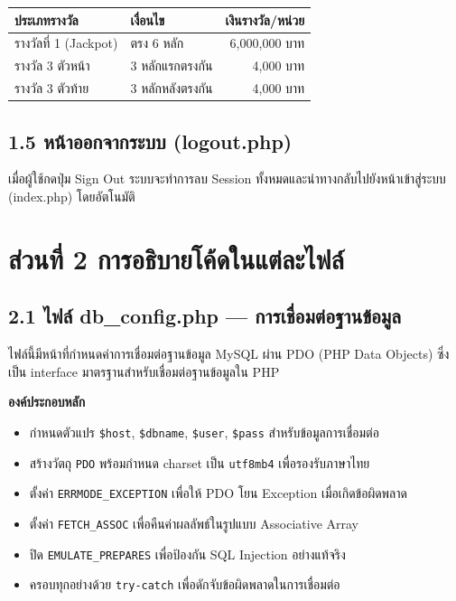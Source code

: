 \documentclass[a4paper,12pt]{article}
\begin{document}
\vspace{0.5em}
\begin{tabularx}{\textwidth}{|l|X|r|}
\hline
\textbf{ประเภทรางวัล} & \textbf{เงื่อนไข} & \textbf{เงินรางวัล/หน่วย} \\
\hline
รางวัลที่ 1 (Jackpot) & ตรง 6 หลัก & 6,000,000 บาท \\
\hline
รางวัล 3 ตัวหน้า & 3 หลักแรกตรงกัน & 4,000 บาท \\
\hline
รางวัล 3 ตัวท้าย & 3 หลักหลังตรงกัน & 4,000 บาท \\
\hline
\end{tabularx}

\subsection*{1.5 หน้าออกจากระบบ (logout.php)}

เมื่อผู้ใช้กดปุ่ม Sign Out ระบบจะทำการลบ Session ทั้งหมดและนำทางกลับไปยังหน้าเข้าสู่ระบบ (index.php) โดยอัตโนมัติ

\newpage

\section*{ส่วนที่ 2 การอธิบายโค้ดในแต่ละไฟล์}

\subsection*{2.1 ไฟล์ db\_config.php --- การเชื่อมต่อฐานข้อมูล}

ไฟล์นี้มีหน้าที่กำหนดค่าการเชื่อมต่อฐานข้อมูล MySQL ผ่าน PDO (PHP Data Objects) ซึ่งเป็น interface มาตรฐานสำหรับเชื่อมต่อฐานข้อมูลใน PHP

\noindent\textbf{องค์ประกอบหลัก}
\begin{itemize}[leftmargin=1.5cm, topsep=2pt, itemsep=1pt]
  \item กำหนดตัวแปร \texttt{\$host}, \texttt{\$dbname}, \texttt{\$user}, \texttt{\$pass} สำหรับข้อมูลการเชื่อมต่อ
  \item สร้างวัตถุ \texttt{PDO} พร้อมกำหนด charset เป็น \texttt{utf8mb4} เพื่อรองรับภาษาไทย
  \item ตั้งค่า \texttt{ERRMODE\_EXCEPTION} เพื่อให้ PDO โยน Exception เมื่อเกิดข้อผิดพลาด
  \item ตั้งค่า \texttt{FETCH\_ASSOC} เพื่อคืนค่าผลลัพธ์ในรูปแบบ Associative Array
  \item ปิด \texttt{EMULATE\_PREPARES} เพื่อป้องกัน SQL Injection อย่างแท้จริง
  \item ครอบทุกอย่างด้วย \texttt{try-catch} เพื่อดักจับข้อผิดพลาดในการเชื่อมต่อ
\end{itemize}
\end{document}
